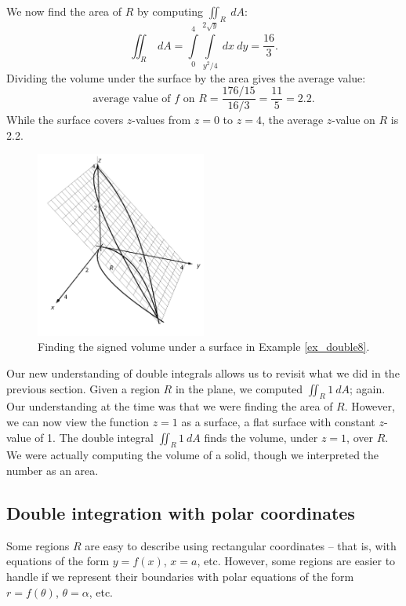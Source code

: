 \begin{example}
We now find the area of $R$ by computing $\iint_R \ dA$:
$$\iint_R \ dA = \int\limits_0^4\int\limits_{y^2/4}^{2\sqrt{y}} \ dx\ dy = \frac{16}{3}.$$
Dividing the volume under the surface by the area gives the average value:
$$\text{average value of $f$ on $R$} = \frac{176/15}{16/3} = \frac{11}5 = 2.2.$$
While the surface covers $z$-values from $z=0$ to $z=4$, the average $z$-value on $R$ is 2.2.

\begin{figure}[H]
	\begin{center}
			\includegraphics[width=0.5\textwidth]{fig_double_11}
	\caption{Finding the signed volume under a surface in Example \ref{ex_double8}.}
	\label{fig_double_11}
	\end{center}
\end{figure}
\end{example}

Our new understanding of double integrals allows us to revisit what we did in the previous section. Given a region $R$ in the plane, we computed $\iint_R 1\ dA$; again. Our understanding at the time was that we were finding the area of $R$. However, we can now view the function $z=1$ as a surface, a flat surface with constant $z$-value of 1. The double integral $\iint_R 1\ dA$ finds the volume, under $z=1$, over $R$. We were actually computing the volume of a solid, though we interpreted the number as an area.




\subsection{Double integration with polar coordinates}
\label{sec:double_int_polar}
Some regions $R$ are easy to describe using rectangular coordinates -- that is, with equations of the form $y=f(x)$, $x=a$, etc. However, some regions are easier to handle if we represent their boundaries with polar equations of the form $r=f(\theta)$, $\theta = \alpha$, etc. 

